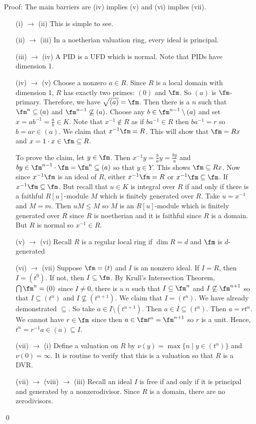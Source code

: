 \noindent Proof: The main barriers are (iv) implies (v) and (vi) implies (vii). 
\begin{enumerate}
\item[(i) $\to$ (ii)] This is simple to see.
\item[(ii) $\to$ (iii)] In a noetherian valuation ring, every ideal is principal.
\item[(iii) $\to$ (iv)] A PID is a UFD which is normal. Note that PIDs have dimension 1.
\item[(iv) $\to$ (v)] Choose a nonzero $a \in R$. Since $R$ is a local domain with dimension 1, $R$ has exactly two primes: $(0)$ and $\fm$. So $(a)$ is $\fm$-primary. Therefore, we have $\sqrt{(a)}=\fm$. Then there is a $n$ such that $\fm^n \subseteq (a)$ and $\fm^{n-1} \not\subseteq (a)$. Choose any $b \in \fm^{n-1} \setminus (a)$ and set $x=ab^{-1}=\frac{a}{b} \in K$. Note that $x^{-1} \notin R$ as if $ba^{-1} \in R$ then $ba^{-1}=r$ so $b=ar \in (a)$. We claim that $x^{-1} \fm =R$. This will show that $\fm=Rx$ and $x=1\cdot x \in \fm \subseteq R$.

To prove the claim, let $y \in \fm$. Then $x^{-1}y=\frac{b}{a}y=\frac{by}{a}$ and $by \in \fm^{n-1}\cdot \fm=\fm^n \subseteq (a)$ so that $y \in Y$. This shows $\fm \subseteq Rx$. Now since $x^{-1}\fm$ is an ideal of $R$, either $x^{-1}\fm=R$ or $x^{-1}\fm \subseteq \fm$. If $x^{-1}\fm \subseteq \fm$. But recall that $u \in K$ is integral over $R$ if and only if there is a faithful $R[u]$-module $M$ which is finitely generated over $R$. Take $u=x^{-1}$ and $M=m$. Then $uM \leq M$ so $M$ is an $R[u]$-module which is finitely generated over $R$ since $R$ is noetherian and it is faithful since $R$ is a domain. But $R$ is normal so $x^{-1} \in R$. 

\item[(v) $\to$ (vi)] Recall $R$ is a regular local ring if $\dim R=d$ and $\fm$ is $d$-generated

\item[(vi) $\to$ (vii)]  Suppose $\fm=(t)$ and $I$ is an nonzero ideal. If $I=R$, then $I=(t^0)$. If not, then $I \subseteq \fm$. By Krull's Intersection Theorem, $\bigcap \fm^n=(0)$ since $I \neq 0$, there is a $n$ such that $I \subseteq \fm^n$ and $I \not\subseteq \fm^{n+1}$ so that $I\subseteq (t^n)$ and $I \not\subseteq (t^{n+1})$. We claim that $I=(t^n)$. We have already demonstrated $\subseteq$. So take $a \in I \setminus (t^{n+1})$. Then $a \in I \subseteq (t^n)$. Then $a=rt^n$. We cannot have $r \in \fm$ since then $a \in \fm t^n=\fm^{n+1}$ so $r$ is a unit. Hence, $t^n=r^{-1}a \in (a) \subseteq I$. 

\item[(vii) $\to$ (i)] Define a valuation on $R$ by $\nu(y)=\max\{n\;|\; y \in (t^n)\}$ and $\nu(0)=\infty$. It is routine to verify that this is a valuation so that $R$ is a DVR.

\item[(vii) $\to$ (viii) $\to$ (iii)] Recall an ideal $I$ is free if and only if it is principal and generated by a nonzerodivisor. Since $R$ is a domain, there are no zerodivisors.  
\end{enumerate}
\qed \\

